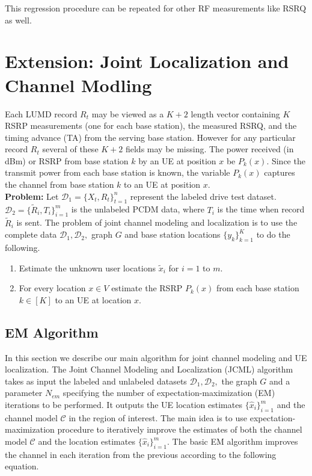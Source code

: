 \documentclass[conference, 10pt]{IEEEtran}
\begin{document}
This regression procedure can be repeated for other RF measurements like RSRQ as
well.

\section{Extension: Joint Localization and Channel Modling}
Each LUMD record $R_t$ may be viewed as a $K+2$ length vector containing $K$
RSRP measurements (one for each base station), the measured RSRQ, and the timing
advance (TA) from the serving base station. However for any particular record
$R_t$ several of these $K+2$ fields may be missing. The power received (in dBm)
or RSRP from base station $k$ by an UE at position $x$ be $P_k(x).$ Since the
transmit power from each base station is known, the variable $P_k(x)$ captures
the channel from base station $k$ to an UE at position $x.$ \\     

\textbf{Problem:} Let $\mathcal{D}_1=\{X_t,R_t\}_{t=1}^n$ represent the labeled
drive test dataset. $\mathcal{D}_2 = \{\tilde{R}_i,T_i\}_{i=1}^m$ is the
unlabeled PCDM data, where $T_i$ is the time when record $\tilde{R}_i$ is sent.
The problem of joint channel modeling and localization is to use the complete
data $\mathcal{D}_1,\mathcal{D}_2,$ graph $G$ and base station locations
$\{y_k\}_{k=1}^K$ to do the following.

\begin{enumerate}

\item Estimate the unknown user locations $\tilde{x}_i$ for $i=1$ to $m.$

\item For every location $x \in V$ estimate the RSRP $P_k(x)$ from each base
	station $k \in [K]$ to an UE at location $x.$


\end{enumerate}  




\subsection{EM Algorithm}

In this section we describe our main algorithm for joint channel modeling and UE
localization. The Joint Channel Modeling and Localization (JCML) algorithm takes
as input the labeled and unlabeled datasets $\mathcal{D}_1,\mathcal{D}_2,$ the
graph $G$ and a parameter $N_{em}$ specifying the number of
expectation-maximization (EM) iterations to be performed. It outputs the UE
location estimates $\{\hat{x}_i\}_{i=1}^m$ and the channel model $\mathcal{C}$
in the region of interest. The main idea is to use expectation-maximization
procedure to iteratively improve the estimates of both the channel model
$\mathcal{C}$ and the location estimates $\{\hat{x}_i\}_{i=1}^m.$ The basic EM
algorithm improves the channel in each iteration from the previous according to
the following equation.
\end{document}
